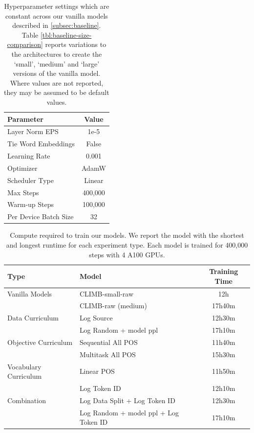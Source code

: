 \begin{table}
    \centering
    \small
    \begin{tabular}{lc}
    \toprule
         Parameter& Value\\
    \midrule
         Layer Norm EPS& 1e-5 \\
         Tie Word Embeddings & False \\
         Learning Rate & 0.001 \\
         Optimizer & AdamW \\
         Scheduler Type & Linear\\
         Max Steps & 400,000 \\
         Warm-up Steps & 100,000\\
         Per Device Batch Size & 32 \\
    \bottomrule
    \end{tabular}
    \caption{Hyperparameter settings which are constant across our vanilla models described in \ref{subsec:baseline}. Table \ref{tbl:baseline-size-comparison} reports variations to the architectures to create the `small', `medium' and `large' versions of the vanilla model. Where values are not reported, they may be assumed to be default values.}
    \label{tbl:baseline_hyperparams}
\end{table}

\begin{table}
    \centering
    \small
    \begin{tabular}{llc}
    \toprule
         Type & Model & Training Time \\
    \midrule
         Vanilla Models & CLIMB-small-raw & 12h \\
         & CLIMB-raw (medium) & 17h40m \\
    \midrule
         Data Curriculum & Log Source & 12h30m \\
         & Log Random + model ppl & 17h10m \\
         Objective Curriculum & Sequential All POS & 11h40m \\
         & Multitask All POS & 15h30m \\
         Vocabulary Curriculum & Linear POS & 11h50m \\
         & Log Token ID & 12h10m \\
    \midrule
        Combination & Log Data Split + Log Token ID & 12h30m \\
        & Log Random + model ppl + Log Token ID & 17h10m \\
    \bottomrule
    \end{tabular}
    \caption{Compute required to train our models. We report the model with the shortest and longest runtime for each experiment type. Each model is trained for 400,000 steps with 4 A100 GPUs.}
    \label{tbl:compute}
\end{table}


